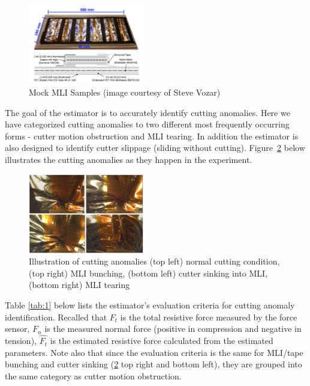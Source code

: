 \documentclass[letterpaper, 10 pt, conference]{ieeeconf}  %
\begin{document}
\begin{figure}[htbp]
\begin{center}
\includegraphics[width=0.45\textwidth]{figures/MLI.png}
\caption{Mock MLI Samples (image courtesy of Steve Vozar)}
\label{fig:2}
\end{center}
\end{figure}


The goal of the estimator is to accurately identify cutting anomalies. Here we have categorized cutting anomalies to two different most frequently occurring forms - cutter motion obstruction and MLI tearing. In addition the estimator is also designed to identify cutter slippage (sliding without cutting).  \noindent Figure~\ref{fig:3} below illustrates the cutting anomalies as they happen in the experiment.  


\begin{figure}[htbp]
\begin{center}
\includegraphics[width=0.45\textwidth]{figures/combine.png}
\caption{Illustration of cutting anomalies (top left) normal cutting condition, (top right) MLI bunching, (bottom left) cutter sinking into MLI, (bottom right) MLI tearing }
\label{fig:3}
\end{center}
\end{figure}

Table \ref{tab:1} below lists the estimator's evaluation criteria for cutting anomaly identification. Recalled that $F_t$  is the total resistive force measured by the force sensor, $F_n$ is the measured normal force (positive in compression and negative in tension), $\hat{F_t}$ is the estimated resistive force calculated from the estimated parameters.  Note also that since the evaluation criteria is the same for MLI/tape bunching and cutter sinking (\ref{fig:3} top right and bottom left), they are grouped into the same category as cutter motion obstruction.
\end{document}
